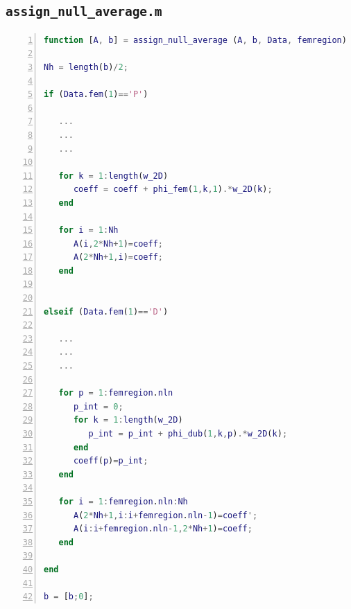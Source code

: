 \documentclass[a4paper,11pt]{article}
\begin{document}
\subsection{\texttt{assign\_null\_average.m}}\label{mean}
\begin{lstlisting}[language=Matlab,basicstyle=\small, numbers=left, numberstyle=\tiny,  name = assign_null_average.m, frame=single]
function [A, b] = assign_null_average (A, b, Data, femregion)

Nh = length(b)/2;

if (Data.fem(1)=='P')

   ...
   ...
   ...

   for k = 1:length(w_2D)
      coeff = coeff + phi_fem(1,k,1).*w_2D(k);
   end

   for i = 1:Nh
      A(i,2*Nh+1)=coeff;
      A(2*Nh+1,i)=coeff;
   end


elseif (Data.fem(1)=='D')

   ...
   ...
   ...

   for p = 1:femregion.nln
      p_int = 0;
      for k = 1:length(w_2D)
         p_int = p_int + phi_dub(1,k,p).*w_2D(k);
      end
      coeff(p)=p_int;
   end

   for i = 1:femregion.nln:Nh
      A(2*Nh+1,i:i+femregion.nln-1)=coeff';
      A(i:i+femregion.nln-1,2*Nh+1)=coeff;
   end

end

b = [b;0];

\end{lstlisting}
    \newpage ~\newpage
    \printbibliography
\end{document}
